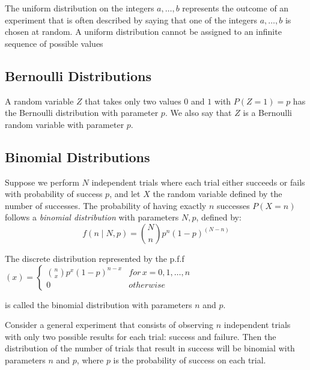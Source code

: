 {\color{red} The uniform distribution on the integers $a, \ldots, b$ represents the outcome of an experiment that is often described by saying that one of the integers $a, \ldots, b$ is chosen at random. A uniform distribution cannot be assigned to an infinite sequence of possible values}


\subsection{Bernoulli Distributions}

\begin{example}
A random variable $Z$ that takes only two values $0$ and $1$ with $P\left(Z=1\right)=p$ has the Bernoulli distribution with parameter $p$. We also say that $Z$ is a Bernoulli random variable with parameter $p$.
\end{example}

\subsection{Binomial Distributions}

\begin{example}
Suppose we perform $N$ independent trials where each trial either succeeds or fails with probability of success $p$, and let $X$ the random variable defined by the number of successes. The probability of having exactly $n$ successes $P(X=n)$ follows a \emph{binomial distribution} with parameters $N, p$, defined by:
\[
f(n\mid N, p) = \binom{N}{n} p^n (1-p)^{(N-n)}
\]
\end{example}

\begin{definition}
The discrete distribution represented by the p.f.f $\left(x\right)=\begin{cases}
{n \choose x}p^{x}\left(1-p\right)^{n-x} & for\,x=0,1,\ldots,n\\
0 & otherwise
\end{cases}$
\end{definition}

{\color{red} is called the binomial distribution with parameters $n$ and $p$.}

{\color{red} Consider a general experiment that consists of observing $n$ independent trials with only two possible results for each trial: success and failure. Then the distribution of the number of trials that result in success will be binomial with parameters $n$ and $p$, where $p$ is the probability of success on each trial.} 


